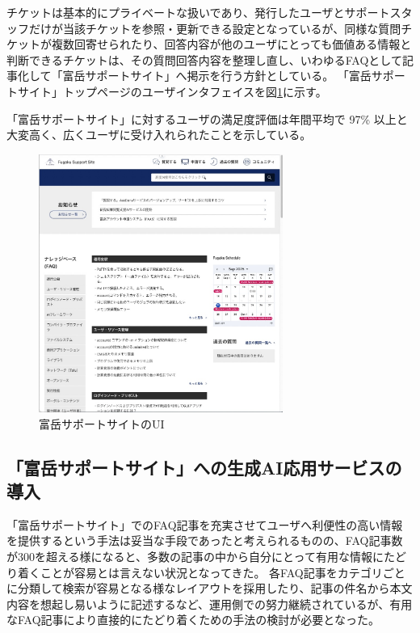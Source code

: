\documentclass{jsaxiesproc}
\begin{document}
チケットは基本的にプライベートな扱いであり、発行したユーザとサポートスタッフだけが当該チケットを参照・更新できる設定となっているが、同様な質問チケットが複数回寄せられたり、回答内容が他のユーザにとっても価値ある情報と判断できるチケットは、その質問回答内容を整理し直し、いわゆるFAQとして記事化して「富岳サポートサイト」へ掲示を行う方針としている。
「富岳サポートサイト」トップページのユーザインタフェイスを図\ref{fig:FugakuSupportSite-Top.jpg}に示す。

「富岳サポートサイト」に対するユーザの満足度評価は年間平均で 97\% 以上と大変高く、広くユーザに受け入れられたことを示している。

\begin{figure}[htbp]
\includegraphics[width=8.0cm]{figs/FugakuSupportSite-Top.jpg}
\caption{富岳サポートサイトのUI}
\label{fig:FugakuSupportSite-Top.jpg}
\end{figure}



\subsection{「富岳サポートサイト」への生成AI応用サービスの導入}

「富岳サポートサイト」でのFAQ記事を充実させてユーザへ利便性の高い情報を提供するという手法は妥当な手段であったと考えられるものの、FAQ記事数が300を超える様になると、多数の記事の中から自分にとって有用な情報にたどり着くことが容易とは言えない状況となってきた。
各FAQ記事をカテゴリごとに分類して検索が容易となる様なレイアウトを採用したり、記事の件名から本文内容を想起し易いように記述するなど、運用側での努力継続されているが、有用なFAQ記事により直接的にたどり着くための手法の検討が必要となった。
\end{document}
